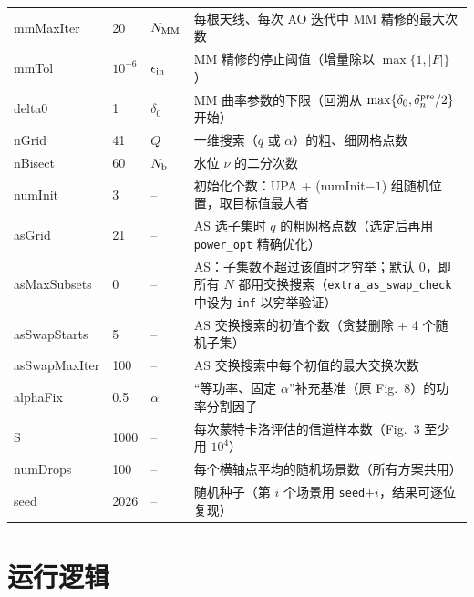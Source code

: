 \documentclass[11pt,a4paper]{ctexart}
\newcommand{\code}[1]{\texttt{#1}}
\begin{document}
\begin{longtable}{>{\ttfamily}p{2.75cm}p{1.6cm}p{2.0cm}p{8.65cm}}
mmMaxIter & 20 & $N_{\rm MM}$ & 每根天线、每次 AO 迭代中 MM 精修的最大次数 \\
mmTol & $10^{-6}$ & $\epsilon_{\rm in}$ & MM 精修的停止阈值（增量除以 $\max\{1,|F|\}$） \\
delta0 & 1 & $\delta_0$ & MM 曲率参数的下限（回溯从 $\max\{\delta_0,\delta_n^{\rm pre}/2\}$ 开始）\\
nGrid & 41 & $Q$ & 一维搜索（$q$ 或 $\alpha$）的粗、细网格点数 \\
nBisect & 60 & $N_{\rm b}$ & 水位 $\nu$ 的二分次数 \\
numInit & 3 & -- & 初始化个数：UPA + (numInit$-1$) 组随机位置，取目标值最大者 \\
asGrid & 21 & -- & AS 选子集时 $q$ 的粗网格点数（选定后再用 \code{power\_opt} 精确优化）\\
asMaxSubsets & 0 & -- & AS：子集数不超过该值时才穷举；默认 0，即所有 $N$ 都用交换搜索（\code{extra\_as\_swap\_check} 中设为 \code{inf} 以穷举验证） \\
asSwapStarts & 5 & -- & AS 交换搜索的初值个数（贪婪删除 + 4 个随机子集）\\
asSwapMaxIter & 100 & -- & AS 交换搜索中每个初值的最大交换次数 \\
alphaFix & 0.5 & $\alpha$ & “等功率、固定 $\alpha$”补充基准（原 Fig.~8）的功率分割因子 \\ \midrule
S & 1000 & -- & 每次蒙特卡洛评估的信道样本数（Fig.~3 至少用 $10^4$）\\
numDrops & 100 & -- & 每个横轴点平均的随机场景数（所有方案共用）\\
seed & 2026 & -- & 随机种子（第 $i$ 个场景用 \code{seed}$+i$，结果可逐位复现）\\
\bottomrule
\end{longtable}

\section{运行逻辑}
\end{document}
